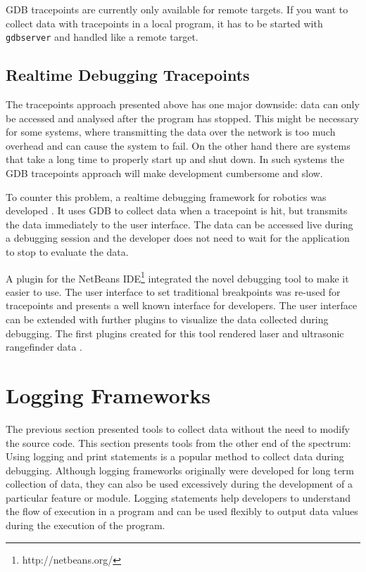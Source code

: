 GDB tracepoints are currently only available for remote targets. If you want to collect data with tracepoints in a local program, it has to be started with \verb+gdbserver+ and handled like a remote target.

\subsection{Realtime Debugging Tracepoints}
The tracepoints approach presented above has one major downside: data can only be accessed and analysed after the program has stopped. This might be necessary for some systems, where transmitting the data over the network is too much overhead and can cause the system to fail. On the other hand there are systems that take a long time to properly start up and shut down. In such systems the GDB tracepoints approach will make development cumbersome and slow.

To counter this problem, a realtime debugging framework for robotics was developed \cite{Gumbley2009}. It uses GDB to collect data when a tracepoint is hit, but transmits the data immediately to the user interface. The data can be accessed live during a debugging session and the developer does not need to wait for the application to stop to evaluate the data.

A plugin for the NetBeans IDE\footnote{http://netbeans.org/} integrated the novel debugging tool to make it easier to use. The user interface to set traditional breakpoints was re-used for tracepoints and presents a well known interface for developers. The user interface can be extended with further plugins to visualize the data collected during debugging. The first plugins created for this tool rendered laser and ultrasonic rangefinder data \cite{Gumbley2009}.




\section{Logging Frameworks}

The previous section presented tools to collect data without the need to modify the source code. This section presents tools from the other end of the spectrum: Using logging and print statements is a popular method to collect data during debugging. Although logging frameworks originally were developed for long term collection of data, they can also be used excessively during the development of a particular feature or module. Logging statements help developers to understand the flow of execution in a program and can be used flexibly to output data values during the execution of the program.

